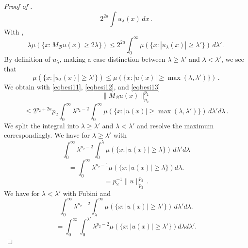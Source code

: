 \begin{proof}[Proof of ]
\begin{equation}
   2^{2a}
    \int u_\lambda (x)\, dx\, .
\end{equation}
With ,
\begin{equation}\label{eqbesi12}
    \lambda \mu(\{x: M_{\mathcal{B}}u(x)\ge 2\lambda\})\le
   2^{2a}
    \int_0^\infty \mu (\{x: |u_\lambda (x)|\ge \lambda'\})\, d\lambda'\, .
\end{equation}
By definition of $u_\lambda$, making a case distinction between $\lambda\ge \lambda'$ and $\lambda <\lambda'$, we see that
\begin{equation}\label{eqbesi13}
   \mu (\{x: |u_\lambda (x)|\ge \lambda'\})
   \le
   \mu (\{x: |u (x)|\ge \max(\lambda,\lambda')\})\, .
\end{equation}
We obtain with \eqref{eqbesi11},
\eqref{eqbesi12}, and \eqref{eqbesi13}
\begin{equation}
    \|M_{\mathcal{B}}u(x)\|_{p_2}^{p_2}
 \end{equation}
 \begin{equation}
   \le 2^{p_2+2a} p_2
   \int_0^\infty \lambda^{p_2-2}
   \int_0^\infty
   \mu (\{x: |u (x)|\ge \max(\lambda,\lambda')\})
   \, d\lambda'd\lambda\, .
\end{equation}
We split the integral into $\lambda\ge \lambda'$ and $\lambda<\lambda'$ and resolve the
maximum correspondingly.
We have for $\lambda\ge \lambda'$
with 
\begin{equation}
    \int_0^\infty \lambda^{p_2-2}
   \int_0^\lambda
   \mu (\{x: |u (x)|\ge \lambda\})
   \, d\lambda'd\lambda
\end{equation}
\begin{equation}
   =\int_0^\infty \lambda^{p_2-1}
     \mu (\{x: |u (x)|\ge \lambda\})
d\lambda.
\end{equation}
\begin{equation}\label{eqbesi14}
   =p_2^{-1} \|u\|_{p_2}^{p_2}\, .
\end{equation}
We have for $\lambda< \lambda'$
with Fubini and 
\begin{equation}
    \int_0^\infty \lambda^{p_2-2}
   \int_\lambda^\infty
   \mu (\{x: |u(x)|\ge \lambda'\})
   \, d\lambda'd\lambda.
\end{equation}
\begin{equation}
   =\int_0^\infty \int_0^{\lambda'}\lambda^{p_2-2}
     \mu (\{x: |u (x)|\ge \lambda'\})
d\lambda d\lambda'.
\end{equation}
\begin{equation}

\end{equation}
\end{proof}

